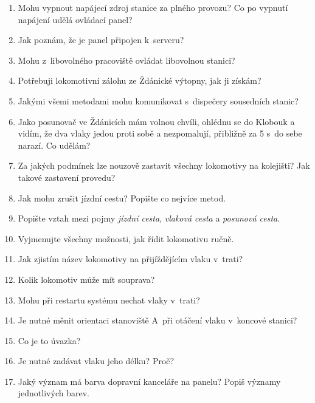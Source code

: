 \documentclass[12pt,a4paper]{article}
\begin{document}
\begin{enumerate}[leftmargin=*]
\item Mohu vypnout napájecí zdroj stanice za plného provozu? Co po vypnutí
napájení udělá ovládací panel?

\item Jak poznám, že je panel připojen k~serveru?

\item Mohu z~libovolného pracoviště ovládat libovolnou stanici?

\item Potřebuji lokomotivní zálohu ze Ždánické výtopny, jak ji získám?

\item Jakými všemi metodami mohu komunikovat s~dispečery sousedních stanic?

\item Jako posunovač ve Ždánicích mám volnou chvíli, ohlédnu se do Klobouk a
vidím, že dva vlaky jedou proti sobě a nezpomalují, přibližně za 5 s~do sebe
narazí. Co udělám?

\item Za jakých podmínek lze nouzově zastavit všechny lokomotivy na kolejišti?
Jak takové zastavení provedu?

\item Jak mohu zrušit jízdní cestu? Popište co nejvíce metod.

\item Popište vztah mezi pojmy \textit{jízdní cesta}, \textit{vlaková cesta} a
\textit{posunová cesta}.

\item Vyjmenujte všechny možnosti, jak řídit lokomotivu ručně.

\item Jak zjistím název lokomotivy na přijíždějícím vlaku v~trati?

\item Kolik lokomotiv může mít souprava?

\item Mohu při restartu systému nechat vlaky v~trati?

\item Je nutné měnit orientaci stanoviště A~při otáčení vlaku v~koncové
stanici?

\item Co je to úvazka?

\item Je nutné zadávat vlaku jeho délku? Proč?

\item Jaký význam má barva dopravní kanceláře na panelu? Popiš významy
jednotlivých barev.


\end{enumerate}
\end{document}
